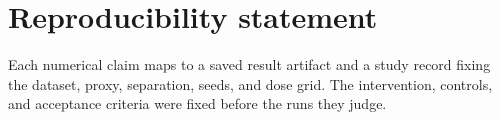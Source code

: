 \documentclass{article}
\begin{document}
\section*{Reproducibility statement}
Each numerical claim maps to a saved result artifact and a study record fixing
the dataset, proxy, separation, seeds, and dose grid. The intervention,
controls, and acceptance criteria were fixed before the runs they judge.



\end{document}
